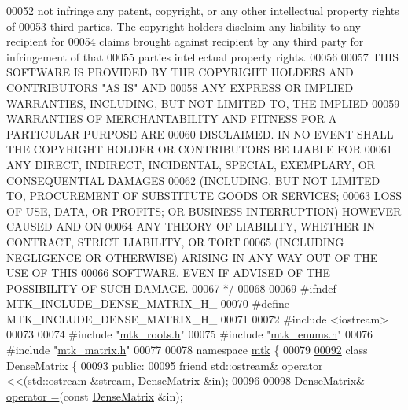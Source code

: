 \begin{DoxyCode}
00052 \textcolor{comment}{not infringe any patent, copyright, or any other intellectual property rights of}
00053 \textcolor{comment}{third parties. The copyright holders disclaim any liability to any recipient for}
00054 \textcolor{comment}{claims brought against recipient by any third party for infringement of that}
00055 \textcolor{comment}{parties intellectual property rights.}
00056 \textcolor{comment}{}
00057 \textcolor{comment}{THIS SOFTWARE IS PROVIDED BY THE COPYRIGHT HOLDERS AND CONTRIBUTORS "AS IS" AND}
00058 \textcolor{comment}{ANY EXPRESS OR IMPLIED WARRANTIES, INCLUDING, BUT NOT LIMITED TO, THE IMPLIED}
00059 \textcolor{comment}{WARRANTIES OF MERCHANTABILITY AND FITNESS FOR A PARTICULAR PURPOSE ARE}
00060 \textcolor{comment}{DISCLAIMED. IN NO EVENT SHALL THE COPYRIGHT HOLDER OR CONTRIBUTORS BE LIABLE FOR}
00061 \textcolor{comment}{ANY DIRECT, INDIRECT, INCIDENTAL, SPECIAL, EXEMPLARY, OR CONSEQUENTIAL DAMAGES}
00062 \textcolor{comment}{(INCLUDING, BUT NOT LIMITED TO, PROCUREMENT OF SUBSTITUTE GOODS OR SERVICES;}
00063 \textcolor{comment}{LOSS OF USE, DATA, OR PROFITS; OR BUSINESS INTERRUPTION) HOWEVER CAUSED AND ON}
00064 \textcolor{comment}{ANY THEORY OF LIABILITY, WHETHER IN CONTRACT, STRICT LIABILITY, OR TORT}
00065 \textcolor{comment}{(INCLUDING NEGLIGENCE OR OTHERWISE) ARISING IN ANY WAY OUT OF THE USE OF THIS}
00066 \textcolor{comment}{SOFTWARE, EVEN IF ADVISED OF THE POSSIBILITY OF SUCH DAMAGE.}
00067 \textcolor{comment}{*/}
00068 
00069 \textcolor{preprocessor}{#ifndef MTK\_INCLUDE\_DENSE\_MATRIX\_H\_}
00070 \textcolor{preprocessor}{#define MTK\_INCLUDE\_DENSE\_MATRIX\_H\_}
00071 
00072 \textcolor{preprocessor}{#include <iostream>}
00073 
00074 \textcolor{preprocessor}{#include "\hyperlink{mtk__roots_8h}{mtk\_roots.h}"}
00075 \textcolor{preprocessor}{#include "\hyperlink{mtk__enums_8h}{mtk\_enums.h}"}
00076 \textcolor{preprocessor}{#include "\hyperlink{mtk__matrix_8h}{mtk\_matrix.h}"}
00077 
00078 \textcolor{keyword}{namespace }\hyperlink{namespacemtk}{mtk} \{
00079 
\hypertarget{mtk__dense__matrix_8h_source_l00092}{}\hyperlink{classmtk_1_1DenseMatrix}{00092} \textcolor{keyword}{class }\hyperlink{classmtk_1_1DenseMatrix}{DenseMatrix} \{
00093  \textcolor{keyword}{public}:
00095   \textcolor{keyword}{friend} std::ostream& \hyperlink{classmtk_1_1DenseMatrix_adbcc850ef373550f634f563573a31d28}{operator <<}(std::ostream &stream, \hyperlink{classmtk_1_1DenseMatrix}{DenseMatrix} &in);
00096 
00098   \hyperlink{classmtk_1_1DenseMatrix}{DenseMatrix}& \hyperlink{classmtk_1_1DenseMatrix_a0d27dc7c4d2c49f391017e392345ced0}{operator =}(\textcolor{keyword}{const} \hyperlink{classmtk_1_1DenseMatrix}{DenseMatrix} &in);

\end{DoxyCode}

